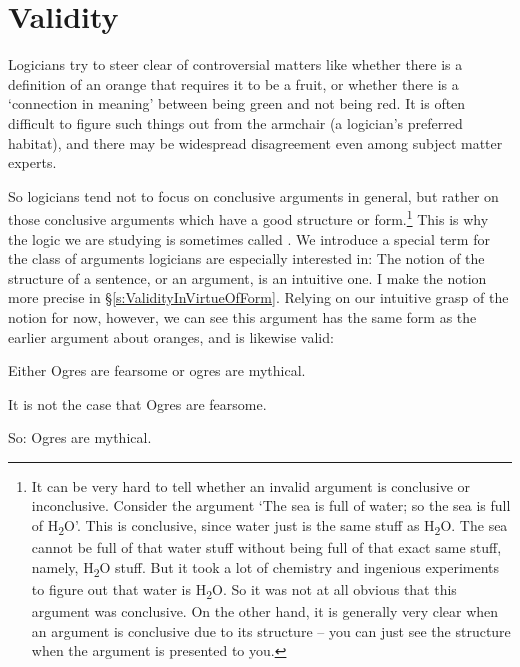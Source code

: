 \section{Validity}\label{s:validityintro}

Logicians try to steer clear of controversial matters like whether there is a definition of an orange that requires it to be a fruit, or whether there is a `connection in meaning' between being green and not being red. It is often difficult to figure such things out from the armchair (a logician's preferred habitat), and there may be widespread disagreement even among subject matter experts.

So logicians tend not to focus on conclusive arguments in general, but rather on those conclusive arguments which have a good structure or form.\footnote{It can be very hard to tell whether an invalid argument is conclusive or inconclusive. Consider the argument `The sea is full of water; so the sea is full of H\textsubscript{2}O'. This is conclusive, since water just is the same stuff as H\textsubscript{2}O. The sea cannot be full of that water stuff without being full of that exact same stuff, namely, H\textsubscript{2}O stuff. But it took a lot of chemistry and ingenious experiments to figure out that water is H\textsubscript{2}O. So it was not at all obvious that this argument was conclusive. On the other hand, it is generally very clear when an argument is conclusive due to its structure – you can just see the structure when the argument is presented to you.} This is why the logic we are studying is sometimes called . We introduce a special term for the class of arguments logicians are especially interested in:
The notion of the structure of a sentence, or an argument, is an intuitive one. I make the notion more precise in §\ref{s:ValidityInVirtueOfForm}. Relying on our intuitive grasp of the notion for now, however, we can see this argument has the same form as the earlier argument about oranges, and is likewise valid:
\begin{earg}
	\item[] \textsf{Either} Ogres are fearsome \textsf{or} ogres are mythical.
	\item[] \textsf{It is not the case that} Ogres are fearsome.
	\item[So:] Ogres are mythical.
\end{earg}


